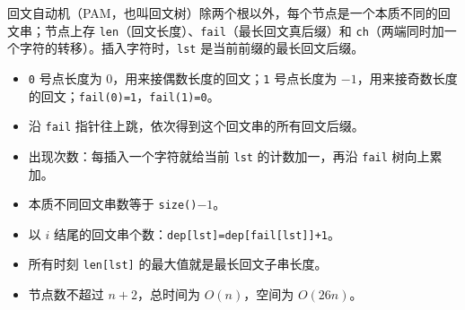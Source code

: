 回文自动机（PAM，也叫回文树）除两个根以外，每个节点是一个本质不同的回文串；节点上存 \texttt{len}（回文长度）、\texttt{fail}（最长回文真后缀）和 \texttt{ch}（两端同时加一个字符的转移）。插入字符时，\texttt{lst} 是当前前缀的最长回文后缀。

\begin{itemize}
  \item \texttt{0} 号点长度为 $0$，用来接偶数长度的回文；\texttt{1} 号点长度为 $-1$，用来接奇数长度的回文；\texttt{fail(0)=1}，\texttt{fail(1)=0}。
  \item 沿 \texttt{fail} 指针往上跳，依次得到这个回文串的所有回文后缀。
  \item 出现次数：每插入一个字符就给当前 \texttt{lst} 的计数加一，再沿 \texttt{fail} 树向上累加。
  \item 本质不同回文串数等于 \texttt{size()}$-1$。
  \item 以 $i$ 结尾的回文串个数：\texttt{dep[lst]=dep[fail[lst]]+1}。
  \item 所有时刻 \texttt{len[lst]} 的最大值就是最长回文子串长度。
  \item 节点数不超过 $n+2$，总时间为 $O(n)$，空间为 $O(26n)$。
\end{itemize}
